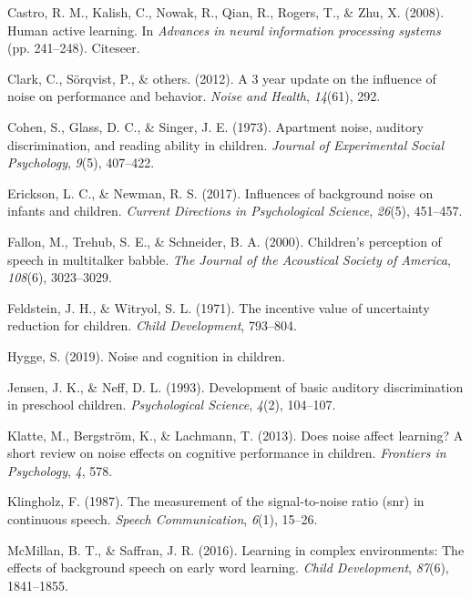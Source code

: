 \documentclass[10pt, letterpaper]{article}
\begin{document}
\leavevmode\hypertarget{ref-castro2008}{}%
Castro, R. M., Kalish, C., Nowak, R., Qian, R., Rogers, T., \& Zhu, X.
(2008). Human active learning. In \emph{Advances in neural information
processing systems} (pp. 241--248). Citeseer.

\leavevmode\hypertarget{ref-clark20123}{}%
Clark, C., Sörqvist, P., \& others. (2012). A 3 year update on the
influence of noise on performance and behavior. \emph{Noise and Health},
\emph{14}(61), 292.

\leavevmode\hypertarget{ref-cohen1973}{}%
Cohen, S., Glass, D. C., \& Singer, J. E. (1973). Apartment noise,
auditory discrimination, and reading ability in children. \emph{Journal
of Experimental Social Psychology}, \emph{9}(5), 407--422.

\leavevmode\hypertarget{ref-erickson2017}{}%
Erickson, L. C., \& Newman, R. S. (2017). Influences of background noise
on infants and children. \emph{Current Directions in Psychological
Science}, \emph{26}(5), 451--457.

\leavevmode\hypertarget{ref-fallon2000}{}%
Fallon, M., Trehub, S. E., \& Schneider, B. A. (2000). Children's
perception of speech in multitalker babble. \emph{The Journal of the
Acoustical Society of America}, \emph{108}(6), 3023--3029.

\leavevmode\hypertarget{ref-feldstein1971}{}%
Feldstein, J. H., \& Witryol, S. L. (1971). The incentive value of
uncertainty reduction for children. \emph{Child Development}, 793--804.

\leavevmode\hypertarget{ref-hygge2019}{}%
Hygge, S. (2019). Noise and cognition in children.

\leavevmode\hypertarget{ref-jensen1993}{}%
Jensen, J. K., \& Neff, D. L. (1993). Development of basic auditory
discrimination in preschool children. \emph{Psychological Science},
\emph{4}(2), 104--107.

\leavevmode\hypertarget{ref-klatte2013}{}%
Klatte, M., Bergström, K., \& Lachmann, T. (2013). Does noise affect
learning? A short review on noise effects on cognitive performance in
children. \emph{Frontiers in Psychology}, \emph{4}, 578.

\leavevmode\hypertarget{ref-klingholz1987}{}%
Klingholz, F. (1987). The measurement of the signal-to-noise ratio (snr)
in continuous speech. \emph{Speech Communication}, \emph{6}(1), 15--26.

\leavevmode\hypertarget{ref-mcmillan2016}{}%
McMillan, B. T., \& Saffran, J. R. (2016). Learning in complex
environments: The effects of background speech on early word learning.
\emph{Child Development}, \emph{87}(6), 1841--1855.
\end{document}

